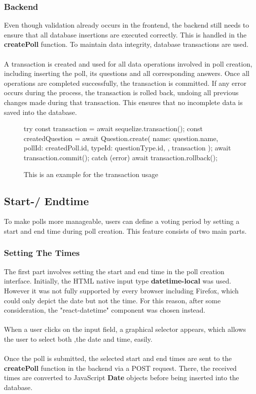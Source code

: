 \documentclass[a4paper,12pt]{report}
\begin{document}
\subsubsection{Backend}
Even though validation already occurs in the frontend, the backend still needs to ensure that all database insertions are executed correctly. This is handled in the \textbf{createPoll} function. To maintain data integrity, database transactions are used.\\\\
A transaction is created and used for all data operations involved in poll creation, including inserting the poll, its questions and all corresponding answers. Once all operations are completed successfully, the transaction is committed. If any error occurs during the process, the transaction is rolled back, undoing all previous changes made during that transaction. This ensures that no incomplete data is saved into the database.
\begin{figure}[H]
	\begin{code}
		try {
			const transaction = await sequelize.transaction();
			const createdQuestion = await Question.create({
				name: question.name,
				pollId: createdPoll.id,
				typeId: questionType.id,
			}, { transaction });
			await transaction.commit();
		} catch (error) {
			await transaction.rollback();
		}
	\end{code}
	\caption{This is an example for the transaction usage}
	\label{fig:example-transaction}
\end{figure} 
\subsection{Start-/ Endtime}
To make polls more manageable, users can define a voting period by setting a start and end time during poll creation. This feature consists of two main parts.
\subsubsection{Setting The Times}
The first part involves setting the start and end time in the poll creation interface. Initially, the HTML native input type \textbf{datetime-local} was used. However it was not fully supported by every browser including Firefox, which could only depict the date but not the time. For this reason, after some consideration, the "react-datetime" component was chosen instead.\\\\
When a user clicks on the input field, a graphical selector appears, which allows the user to select both ,the date and time, easily.\\\\
Once the poll is submitted, the selected start and end times are sent to the \textbf{createPoll} function in the backend via a POST request. There, the received times are converted to JavaScript \textbf{Date} objects before being inserted into the database.
\end{document}
